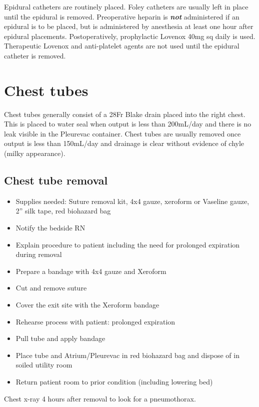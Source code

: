 \documentclass[
  letterpaper,
]{scrbook}
\providecommand{\tightlist}{%
  \setlength{\itemsep}{0pt}\setlength{\parskip}{0pt}}
\begin{document}
Epidural catheters are routinely placed. Foley catheters are usually
left in place until the epidural is removed. Preoperative heparin is
\textbf{\emph{not}} administered if an epidural is to be placed, but is
administered by anesthesia at least one hour after epidural placements.
Postoperatively, prophylactic Lovenox 40mg sq daily is used. Therapeutic
Lovenox and anti-platelet agents are not used until the epidural
catheter is removed.

\section{Chest tubes}\label{chest-tubes}

Chest tubes generally consist of a 28Fr Blake drain placed into the
right chest. This is placed to water seal when output is less than
200mL/day and there is no leak visible in the Pleurevac container. Chest
tubes are usually removed once output is less than 150mL/day and
drainage is clear without evidence of chyle (milky appearance).

\subsection{Chest tube removal}\label{chest-tube-removal}

\begin{itemize}
\tightlist
\item
  Supplies needed: Suture removal kit, 4x4 gauze, xeroform or Vaseline
  gauze, 2'' silk tape, red biohazard bag
\item
  Notify the bedside RN
\item
  Explain procedure to patient including the need for prolonged
  expiration during removal
\item
  Prepare a bandage with 4x4 gauze and Xeroform
\item
  Cut and remove suture
\item
  Cover the exit site with the Xeroform bandage
\item
  Rehearse process with patient: prolonged expiration
\item
  Pull tube and apply bandage
\item
  Place tube and Atrium/Pleurevac in red biohazard bag and dispose of in
  soiled utility room
\item
  Return patient room to prior condition (including lowering bed)
\end{itemize}

Chest x-ray 4 hours after removal to look for a pneumothorax.
\end{document}
